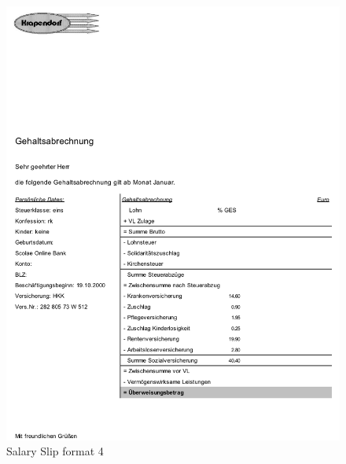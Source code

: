 \begin{figure}[H]
\centering
\includegraphics[scale=0.6]{images/GA-Formats/ga-format-4.png}
\caption{Salary Slip format 4}
\label{ls_format2}
\end{figure}

